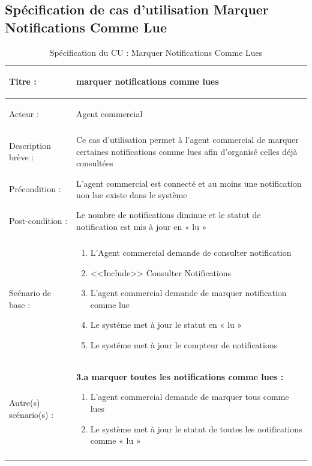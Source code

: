 \newpage
{}
\subsection{Spécification de cas d'utilisation Marquer Notifications Comme Lue}

\begin{longtable}{|>{\bfseries\raggedright\arraybackslash}p{3.5cm}|p{\dimexpr\textwidth-3.5cm-4\tabcolsep-2\arrayrulewidth}|}
\hline
Titre : & marquer notifications comme lues \\
\hline
Acteur : & Agent commercial \\
\hline
Description brève : & Ce cas d'utilisation permet à l'agent commercial de marquer certaines notifications comme lues afin d'organisé celles déjà consultées \\
\hline
Précondition : & L'agent commercial est connecté et au moins une notification non lue existe dans le système \\
\hline
Post-condition : & Le nombre de notifications diminue et le statut de notification est mis à jour en « lu » \\
\hline
Scénario de base : &
\begin{enumerate}[leftmargin=1.5em, topsep=2pt, itemsep=1pt]
  \item L'Agent commercial demande de consulter notification
  \item <<Include>> Consulter Notifications
  \item L'agent commercial demande de marquer notification comme lue
  \item Le systéme met à jour le statut en « lu »
  \item Le systéme met à jour le compteur de notifications
\end{enumerate} \\
\hline
Autre(s) scénario(s) : &
\textbf{3.a marquer toutes les notifications comme lues :}
\begin{enumerate}[leftmargin=1.5em, topsep=2pt, itemsep=1pt]
  \item L'agent commercial demande de marquer tous comme lues
  \item Le système met à jour le statut de toutes les notifications comme « lu »
\end{enumerate} \\
\hline
\caption{Spécification du CU : Marquer Notifications Comme Lues}
\label{tab:cu-marquer-notif}
\end{longtable}


